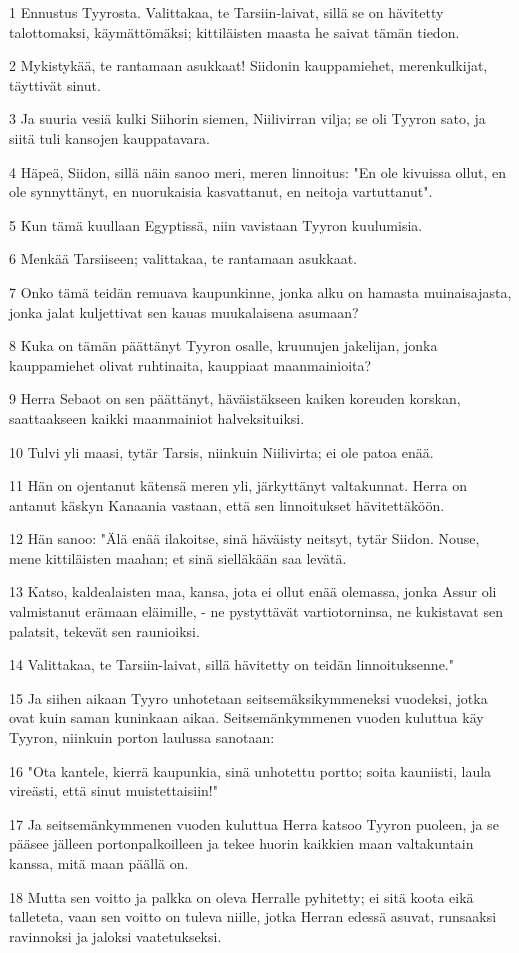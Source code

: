 \par 1 Ennustus Tyyrosta. Valittakaa, te Tarsiin-laivat, sillä se on hävitetty talottomaksi, käymättömäksi; kittiläisten maasta he saivat tämän tiedon.
\par 2 Mykistykää, te rantamaan asukkaat! Siidonin kauppamiehet, merenkulkijat, täyttivät sinut.
\par 3 Ja suuria vesiä kulki Siihorin siemen, Niilivirran vilja; se oli Tyyron sato, ja siitä tuli kansojen kauppatavara.
\par 4 Häpeä, Siidon, sillä näin sanoo meri, meren linnoitus: "En ole kivuissa ollut, en ole synnyttänyt, en nuorukaisia kasvattanut, en neitoja vartuttanut".
\par 5 Kun tämä kuullaan Egyptissä, niin vavistaan Tyyron kuulumisia.
\par 6 Menkää Tarsiiseen; valittakaa, te rantamaan asukkaat.
\par 7 Onko tämä teidän remuava kaupunkinne, jonka alku on hamasta muinaisajasta, jonka jalat kuljettivat sen kauas muukalaisena asumaan?
\par 8 Kuka on tämän päättänyt Tyyron osalle, kruunujen jakelijan, jonka kauppamiehet olivat ruhtinaita, kauppiaat maanmainioita?
\par 9 Herra Sebaot on sen päättänyt, häväistäkseen kaiken koreuden korskan, saattaakseen kaikki maanmainiot halveksituiksi.
\par 10 Tulvi yli maasi, tytär Tarsis, niinkuin Niilivirta; ei ole patoa enää.
\par 11 Hän on ojentanut kätensä meren yli, järkyttänyt valtakunnat. Herra on antanut käskyn Kanaania vastaan, että sen linnoitukset hävitettäköön.
\par 12 Hän sanoo: "Älä enää ilakoitse, sinä häväisty neitsyt, tytär Siidon. Nouse, mene kittiläisten maahan; et sinä sielläkään saa levätä.
\par 13 Katso, kaldealaisten maa, kansa, jota ei ollut enää olemassa, jonka Assur oli valmistanut erämaan eläimille, - ne pystyttävät vartiotorninsa, ne kukistavat sen palatsit, tekevät sen raunioiksi.
\par 14 Valittakaa, te Tarsiin-laivat, sillä hävitetty on teidän linnoituksenne."
\par 15 Ja siihen aikaan Tyyro unhotetaan seitsemäksikymmeneksi vuodeksi, jotka ovat kuin saman kuninkaan aikaa. Seitsemänkymmenen vuoden kuluttua käy Tyyron, niinkuin porton laulussa sanotaan:
\par 16 "Ota kantele, kierrä kaupunkia, sinä unhotettu portto; soita kauniisti, laula vireästi, että sinut muistettaisiin!"
\par 17 Ja seitsemänkymmenen vuoden kuluttua Herra katsoo Tyyron puoleen, ja se pääsee jälleen portonpalkoilleen ja tekee huorin kaikkien maan valtakuntain kanssa, mitä maan päällä on.
\par 18 Mutta sen voitto ja palkka on oleva Herralle pyhitetty; ei sitä koota eikä talleteta, vaan sen voitto on tuleva niille, jotka Herran edessä asuvat, runsaaksi ravinnoksi ja jaloksi vaatetukseksi.

